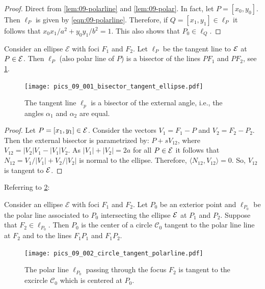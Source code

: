 \begin{proof} Direct from \cref{lem:09-polarline} and \cref{lem:09-polar}. In fact, let $P=[x_0,y_0]$. Then $\ell_P$ is given by \cref{eqn:09-polarline}. Therefore, if $Q=[x_1,y_1]\in \ell_P$ it follows that
$x_0x_1/a^2+y_0y_1/b^2=1$. This also shows that $P_0\in \ell_Q.$
\end{proof}

\begin{proposition}
    Consider an ellipse $\mathcal{E}$ with foci $F_1$ and $F_2$. Let $\ell_P$ be the tangent line to $\mathcal{E}$ at $P\in \mathcal{E}$. Then $\ell_P$ (also polar line of $P$)  is a bisector of the   lines $PF_1$ and $PF_2$, see \cref{fig:bisectorline}.  
\label{prop:09-bisectorline}
\end{proposition}

\begin{figure} 
	\begin{center}
		 \texttt{[image: pics\_09\_001\_bisector\_tangent\_ellipse.pdf]}
		\caption {The tangent line $\ell_p$ is a bisector of the external angle, i.e., the angles $\alpha_1$ and $\alpha_2$ are equal. 	\label{fig:bisectorline} }
	\end{center}

\end{figure}

\begin{proof} Let $P=[x_1,y_1]\in \mathcal{E}$. Consider the vectors $V_1=F_1-P$ and $V_2=F_2-P_2$.
Then the external bisector  is parametrized by:  $P+sV_{12}$, where $V_{12}=|V_2|V_1-|V_1|V_2$. As $|V_1|+|V_2|=2a$ for all $P\in \mathcal{E}$ it follows that $N_{12}=V_1/|V_1|+V_2/|V_2|$ is normal to the ellipse. Therefore, $\langle N_{12},V_{12}\rangle=0$. So,
$V_{12}$ is tangent to $\mathcal{E}$.
\end{proof}

Referring to \cref{fig:09-circle-polarline}:

\begin{proposition}
\label{prop:09-circle-polarline}
    Consider an ellipse $\mathcal{E}$ with foci $F_1$ and $F_2$. Let $ P_0 $ be an exterior point and $\ell_{P_0}$ be the polar line associated to $P_0$ intersecting the ellipse $\mathcal{E}$ at $P_1$ and $P_2$. Suppose that $F_2\in \ell_{P_0}$. Then $P_0$ is  the center of a circle $\mathcal{C}_0$  tangent to the polar line line at $F_2$ and to the lines $F_1P_1$ and $F_1P_2$. 
\end{proposition}

\begin{figure} 
	\begin{center}
		 \texttt{[image: pics\_09\_002\_circle\_tangent\_polarline.pdf]}
		\caption{The polar line $\ell_{P_0}$ passing through the focus $F_2$ is tangent to the excircle $\mathcal{C}_0$ which is centered at $P_0$.}
	\end{center}
\label{fig:09-circle-polarline} 
\end{figure}

